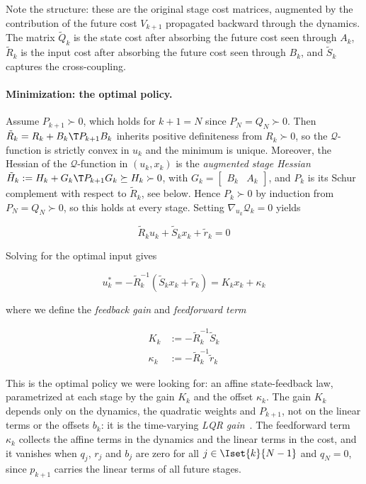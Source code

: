 Note the structure:
these are the original stage cost matrices, augmented by the contribution of the future cost $V_{k+1}$ propagated backward through the dynamics.
The matrix $\tilde{Q}_k$ is the state cost after absorbing the future cost seen through $A_k$, $\tilde{R}_k$ is the input cost after absorbing the future cost seen through $B_k$, and $\tilde{S}_k$ captures the cross-coupling.

\paragraph{Minimization: the optimal policy.}
Assume $P_{k+1} \succ 0$, which holds for $k+1 = N$ since $P_N = Q_N \succ 0$.
Then $\tilde{R}_k = R_k + B_k\T P_{k+1} B_k$ inherits positive definiteness from $R_k \succ 0$, so the $\mathcal{Q}$-function is strictly convex in $u_k$ and the minimum is unique.
Moreover, the Hessian of the $\mathcal{Q}$-function in $(u_k, x_k)$ is the \textit{augmented stage Hessian} $\tilde{H}_k := H_k + G_k\T P_{k+1} G_k \succeq H_k \succ 0$, with $G_k = \begin{bmatrix} B_k & A_k \end{bmatrix}$, and $P_k$ is its Schur complement with respect to $\tilde{R}_k$, see below.
Hence $P_k \succ 0$ by induction from $P_N = Q_N \succ 0$, so this holds at every stage.
Setting $\nabla_{u_k} \mathcal{Q}_k = 0$ yields

\[
\tilde{R}_k u_k + \tilde{S}_k x_k + \tilde{r}_k = 0
\]

Solving for the optimal input gives

\begin{equation} \label{eq:optimal_policy}
u_k^* = - \tilde{R}_k^{-1} \left( \tilde{S}_k x_k + \tilde{r}_k \right) = K_k x_k + \kappa_k
\end{equation}

where we define the \textit{feedback gain} and \textit{feedforward term}

\begin{align}
K_k &:= -\tilde{R}_k^{-1} \tilde{S}_k \label{eq:gain} \\
\kappa_k &:= -\tilde{R}_k^{-1} \tilde{r}_k \label{eq:feedforward}
\end{align}

This is the optimal policy we were looking for: an affine state-feedback law, parametrized at each stage by the gain $K_k$ and the offset $\kappa_k$.
The gain $K_k$ depends only on the dynamics, the quadratic weights and $P_{k+1}$, not on the linear terms or the offsets $b_k$: it is the time-varying \textit{LQR gain}~\cite{kalman1960contributions}.
The feedforward term $\kappa_k$ collects the affine terms in the dynamics and the linear terms in the cost, and it vanishes when $q_j$, $r_j$ and $b_j$ are zero for all $j \in \Iset{k}{N-1}$ and $q_N = 0$, since $p_{k+1}$ carries the linear terms of all future stages.

